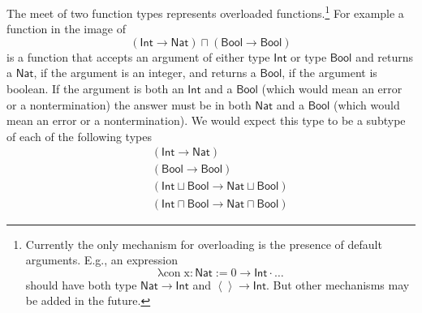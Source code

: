 \documentclass[12pt]{article}
\begin{document}
The meet of two function types represents overloaded functions.\footnote{%
Currently the only mechanism for overloading is the presence of default
arguments. E.g., an expression%
\begin{equation*}
\mathrm{\lambda con\;x:\mathsf{Nat}:=0\rightarrow \mathsf{Int}\cdot \ldots }
\end{equation*}%
should have both type $\mathsf{Nat\rightarrow Int}$ and $\left\langle
{}\right\rangle \rightarrow \mathsf{Int}$. But other mechanisms may be added
in the future.} For example a function in the image of%
\begin{equation*}
\left( \mathsf{Int}\rightarrow \mathsf{Nat}\right) \sqcap \left( \mathsf{Bool%
}\rightarrow \mathsf{Bool}\right)
\end{equation*}%
is a function that accepts an argument of either type $\mathsf{Int}$ or type 
$\mathsf{Bool}$ and returns a $\mathsf{Nat}$, if the argument is an integer,
and returns a $\mathsf{Bool}$, if the argument is boolean. If the argument
is both an $\mathsf{Int}$ and a $\mathsf{Bool}$ (which would mean an error
or a nontermination) the answer must be in both $\mathsf{Nat}$ and a $%
\mathsf{Bool}$ (which would mean an error or a nontermination). We would
expect this type to be a subtype of each of the following types%
\begin{eqnarray*}
&&\left( \mathsf{Int}\rightarrow \mathsf{Nat}\right) \\
&&\left( \mathsf{Bool}\rightarrow \mathsf{Bool}\right) \\
&&\left( \mathsf{Int}\sqcup \mathsf{Bool}\rightarrow \mathsf{Nat}\sqcup 
\mathsf{Bool}\right) \\
&&\left( \mathsf{Int}\sqcap \mathsf{Bool}\rightarrow \mathsf{Nat\sqcap Bool}%
\right)
\end{eqnarray*}
\end{document}
